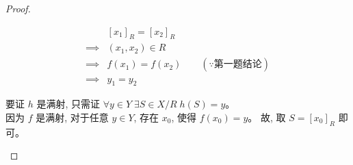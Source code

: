 \documentclass[a4paper, justified]{tufte-handout}
\begin{document}
\begin{proof}
\begin{enumerate}[(1)]
\begin{itemize}
\begin{align*}
            & [x_{1}]_{R} = [x_{2}]_{R} \\
            \implies & (x_{1}, x_{2}) \in R \\
            \implies & f(x_{1}) = f(x_{2}) \qquad (\because \text{第一题结论}) \\
            \implies & y_{1} = y_{2}
          \end{align*}
      \end{itemize}
      要证 $h$ 是满射, 只需证 $\forall y \in Y\; \exists S \in X/R\; h(S) = y$。\\
      因为 $f$ 是满射, 对于任意 $y \in Y$, 存在 $x_{0}$, 使得 $f(x_{0}) = y$。
      故, 取 $S = [x_{0}]_{R}$ 即可。
  \end{enumerate}
\end{proof}


\end{document}
